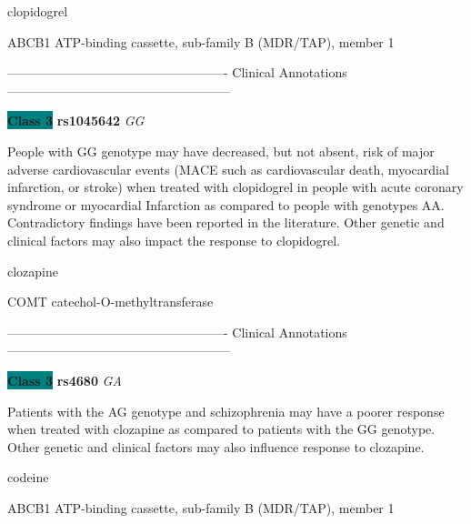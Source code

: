 \documentclass{resume} %
\begin{document}
\begin{rSection}{ clopidogrel }
\begin{rSubsection}{ ABCB1 }{ ATP-binding cassette, sub-family B (MDR/TAP), member 1 }{}{}
\item[] ---------------------------------------------------- Clinical Annotations -----------------------------------------------------\newline
\item \textbf{\colorbox{teal} {Class 3}} \textbf{ rs1045642 } \textit{ GG }
\item[] People with GG  genotype may have decreased, but not absent, risk of major adverse cardiovascular events (MACE such as cardiovascular death, myocardial infarction, or stroke) when treated with clopidogrel in people with acute coronary syndrome or myocardial Infarction as compared to people with genotypes AA. Contradictory findings have been reported in the literature. Other genetic and clinical factors may also impact the response to clopidogrel.
\end{rSubsection}

\end{rSection}\begin{rSection}{ clozapine }
\item[]

\begin{rSubsection}{ COMT }{ catechol-O-methyltransferase }{}{}
\item[]

\item[] ---------------------------------------------------- Clinical Annotations -----------------------------------------------------\newline
\item \textbf{\colorbox{teal} {Class 3}} \textbf{ rs4680 } \textit{ GA }
\item[] Patients with the AG genotype and schizophrenia may have a poorer response when treated with clozapine as compared to patients with the GG genotype. Other genetic and clinical factors may also influence response to clozapine.
\end{rSubsection}

\end{rSection}\begin{rSection}{ codeine }
\item[]

\begin{rSubsection}{ ABCB1 }{ ATP-binding cassette, sub-family B (MDR/TAP), member 1 }{}{}
\item[]


\end{rSubsection}
\end{rSection}
\end{document}
